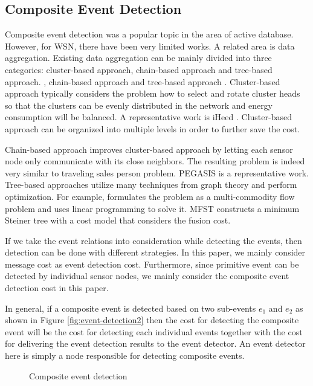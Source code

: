 \subsection{Composite Event Detection}
Composite event detection was a popular topic in the area of active database. However, for WSN, there have been very limited works. A related area is data aggregation. Existing data aggregation can be mainly divided into three categories: cluster-based approach, chain-based approach and tree-based approach. \cite{leach, iheed, epas}, chain-based approach \cite{pegasis} and tree-based approach \cite{mfst, dctc, tag, xue:lp, tina}. Cluster-based approach typically considers the problem how to select and rotate cluster heads so that the clusters can be evenly distributed in the network  and energy consumption will be balanced. A representative work is iHeed \cite{iheed}. Cluster-based approach can be organized into multiple levels in order to further save the cost.

Chain-based approach improves cluster-based approach by letting each sensor node only communicate with its close neighbors. The resulting problem is indeed very similar to traveling sales person problem. PEGASIS \cite{pegasis} is a representative work. Tree-based approaches utilize many techniques from graph theory and perform optimization. For example, \cite{xue:lp} formulates the problem as a multi-commodity flow problem and uses linear programming to solve it.  MFST \cite{mfst} constructs a minimum Steiner tree with a cost model that considers the fusion cost.

If we take the event relations into consideration while detecting the events, then detection can be done with different strategies. In this paper, we mainly consider message cost as event detection cost. Furthermore, since primitive event can be detected by individual sensor nodes, we mainly consider the composite event detection cost in this paper.

In general, if a composite event is detected based on two sub-events \(e_1\) and \(e_2\) as shown in Figure \ref{fig:event-detection2} then the cost for detecting the composite event will be the cost for detecting each individual events together with the cost for delivering the event detection results to the event detector. An event detector here is simply a node responsible for detecting composite events.

\begin{figure}
\centering
{}
\caption{Composite event detection}
\label{fig:event-detection}
\end{figure}

